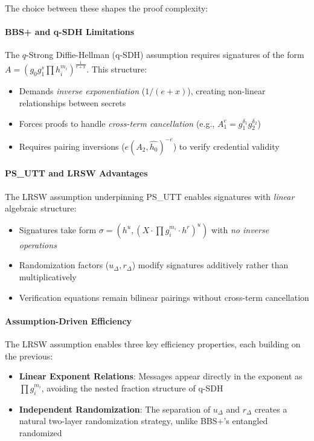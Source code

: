 The choice between these shapes the proof complexity:

\paragraph{BBS+ and q-SDH Limitations}
The $q$-Strong Diffie-Hellman (q-SDH) assumption \cite{boneh_short_2008} requires signatures of the form $A = (g_0g_1^s\prod h_i^{m_i})^{\frac{1}{e+x}}$. This structure:
\begin{itemize}
    \item Demands \textit{inverse exponentiation} ($1/(e+x)$), creating non-linear relationships between secrets
    \item Forces proofs to handle \textit{cross-term cancellation} (e.g., $A_1^e = g_1^{\delta_1}g_2^{\delta_2}$)
    \item Requires pairing inversions ($e(A_2, \hat{h_0})^{-e}$) to verify credential validity
\end{itemize}


\paragraph{PS\_UTT and LRSW Advantages}
The LRSW assumption \cite{lysyanskaya2000pseudonym} underpinning PS\_UTT enables signatures with \textit{linear} algebraic structure:
\begin{itemize}
    \item Signatures take form $\sigma = (h^u, (X \cdot \prod g_i^{m_i} \cdot h^r)^u)$ with \textit{no inverse operations}
    \item Randomization factors ($u_\Delta, r_\Delta$) modify signatures additively rather than multiplicatively
    \item Verification equations remain bilinear pairings without cross-term cancellation
\end{itemize}


\paragraph{Assumption-Driven Efficiency}
The LRSW assumption enables three key efficiency properties, each building on the previous:
\begin{itemize}
    \item \textbf{Linear Exponent Relations}: Messages appear directly in the exponent as $\prod g_i^{m_i}$, avoiding the nested fraction structure of q-SDH
    \item \textbf{Independent Randomization}: The separation of $u_\Delta$ and $r_\Delta$ creates a natural two-layer randomization strategy, unlike BBS+'s entangled randomized
\end{itemize}





